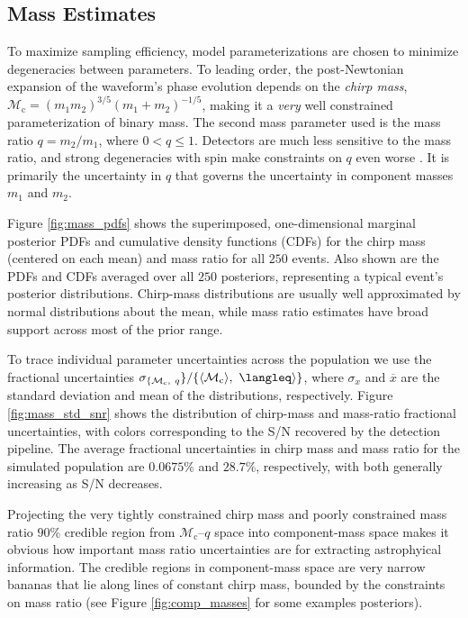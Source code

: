 \subsection{Mass Estimates}\label{sec:mass}
To maximize sampling efficiency, model parameterizations are chosen to minimize degeneracies between parameters.  To leading order, the post-Newtonian expansion of the waveform's phase evolution depends on the \emph{chirp mass}, $\mathcal{M}_\mathrm{c} = (m_1 m_2)^{3/5} (m_1 + m_2)^{-1/5}$, making it a \emph{very} well constrained parameterization of binary mass.  The second mass parameter used is the mass ratio $q = m_2/m_1$, where $0 < q \leq 1$.  Detectors are much less sensitive to the mass ratio, and strong degeneracies with spin make constraints on $q$ even worse \citep{Cutler_1994}.  It is primarily the uncertainty in $q$ that governs the uncertainty in component masses $m_1$ and $m_2$.

Figure \ref{fig:mass_pdfs} shows the superimposed, one-dimensional marginal posterior PDFs and cumulative density functions (CDFs) for the chirp mass (centered on each mean) and mass ratio for all $250$ events.  Also shown are the PDFs and CDFs averaged over all $250$ posteriors, representing a typical event's posterior distributions.  Chirp-mass distributions are usually well approximated by normal distributions about the mean, while mass ratio estimates have broad support across most of the prior range.

To trace individual parameter uncertainties across the population we use the fractional uncertainties $\sigma_{\{\mathcal{M}_\mathrm{c},~q}\}/\{\langle\mathcal{M}_\mathrm{c}\rangle,~\langleq\rangle\}$, where $\sigma_x$ and $\overline{x}$ are the standard deviation and mean of the distributions, respectively.  Figure \ref{fig:mass_std_snr} shows the distribution of chirp-mass and mass-ratio fractional uncertainties, with colors corresponding to the S/N recovered by the detection pipeline. The average fractional uncertainties in chirp mass and mass ratio for the simulated population are $0.0675\%$ and $28.7\%$, respectively, with both generally increasing as S/N decreases.
  
Projecting the very tightly constrained chirp mass and poorly constrained mass ratio $90\%$ credible region from $\mathcal{M}_\mathrm{c}$--$q$ space into component-mass space makes it obvious how important mass ratio uncertainties are for extracting astrophyical information.  The credible regions in component-mass space are very narrow bananas that lie along lines of constant chirp mass, bounded by the constraints on mass ratio (see Figure \ref{fig:comp_masses} for some examples posteriors).
  
  
  